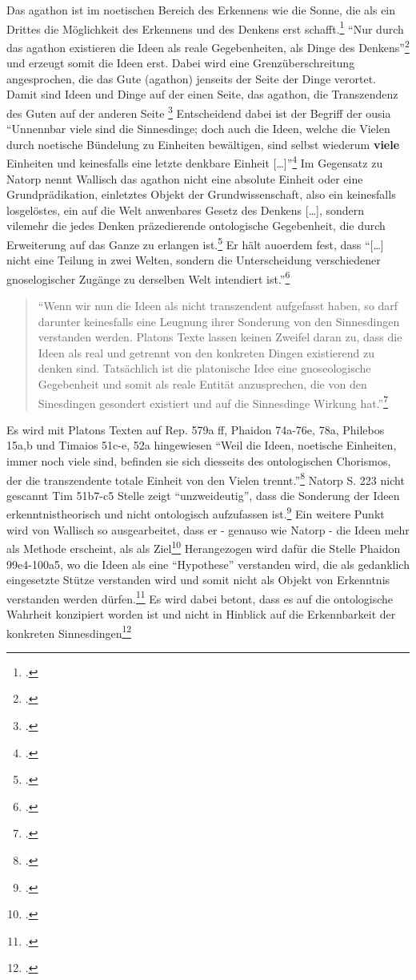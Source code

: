 \documentclass[12pt]{article}
\newcommand*{\zitatblock}[1]{%
    \begin{quote}
    \fontsize{10}{12}\selectfont
    \setlength{\parskip}{1.0em}
    #1
    \end{quote}
}
\begin{document}
Das agathon ist im noetischen Bereich des Erkennens wie die Sonne, die als ein Drittes die Möglichkeit des Erkennens und des Denkens erst schafft.\footcite[vgl.][S. 10]{Wallisch} 
\enquote{Nur durch das agathon existieren die Ideen als reale Gegebenheiten, als Dinge des Denkens}\footcite[][S. 11]{Wallisch} und erzeugt somit die Ideen erst. Dabei wird eine Grenzüberschreitung angesprochen, die das Gute (agathon) jenseits der Seite der Dinge verortet. Damit sind Ideen und Dinge auf der einen Seite, das agathon, die Transzendenz des Guten auf der anderen Seite \footcite[vgl.][S. 11]{Wallisch}
Entscheidend dabei ist der Begriff der ousia
\enquote{Unnennbar viele sind die Sinnesdinge; doch auch die Ideen, welche die Vielen durch noetische Bündelung zu Einheiten bewältigen, sind selbst wiederum \textbf{viele} Einheiten und keinesfalls eine letzte denkbare Einheit [\dots]}\footcite[vgl.][S. 12]{Wallisch}
Im Gegensatz zu Natorp nennt Wallisch das agathon nicht eine absolute Einheit oder eine Grundprädikation, einletztes Objekt der Grundwissenschaft, also ein keinesfalls losgelöstes, ein auf die Welt anwenbares Gesetz des Denkens [\dots], sondern vilemehr die jedes Denken präzedierende ontologische Gegebenheit, die durch Erweiterung auf das Ganze zu erlangen ist.\footcite[vgl.][S. 14]{Wallisch}
Er hält auoerdem fest, dass \enquote{[\dots] nicht eine Teilung in zwei Welten, sondern die Unterscheidung verschiedener gnoselogischer Zugänge zu derselben Welt intendiert ist.}\footcite[vgl.][S. 15]{Wallisch}
\zitatblock{\enquote{Wenn wir nun die Ideen als nicht transzendent aufgefasst haben, so darf darunter keinesfalls eine Leugnung ihrer Sonderung von den Sinnesdingen verstanden werden. Platons Texte lassen keinen Zweifel daran zu, dass die Ideen als real und getrennt von den konkreten Dingen existierend zu denken sind. Tatsächlich ist die platonische Idee eine gnoseologische Gegebenheit und somit als reale Entität anzusprechen, die von den Sinesdingen gesondert existiert und auf die Sinnesdinge Wirkung hat.}\footcite[][S. 17]{Wallisch}}
Es wird mit Platons Texten auf Rep. 579a ff, Phaidon 74a-76e, 78a, Philebos 15a,b und Timaios 51c-e, 52a hingewiesen
\enquote{Weil die Ideen, noetische Einheiten, immer noch viele sind, befinden sie sich diesseits des ontologischen Chorismos, der die transzendente totale Einheit von den Vielen trennt.}\footcite[][S. 17]{Wallisch}
Natorp S. 223 nicht gescannt
Tim 51b7-c5 Stelle zeigt \enquote{unzweideutig}, dass die Sonderung der Ideen erkenntnistheorisch und nicht ontologisch aufzufassen ist.\footcite[vgl.][S. 19]{Wallisch}
Ein weitere Punkt wird von Wallisch so ausgearbeitet, dass er - genauso wie Natorp - die Ideen mehr als Methode erscheint, als als Ziel\footcite[vgl.][S. 26]{Wallisch} Herangezogen wird dafür die Stelle Phaidon 99e4-100a5, wo die Ideen als eine \enquote{Hypothese} verstanden wird, die als gedanklich eingesetzte Stütze verstanden wird und somit nicht als Objekt von Erkenntnis verstanden werden dürfen.\footcite[vgl.][S. 26]{Wallisch} Es wird dabei betont, dass es auf die ontologische Wahrheit konzipiert worden ist und nicht in Hinblick auf die Erkennbarkeit der konkreten Sinnesdingen\footcite[vgl.][S. 27]{Wallisch}
\end{document}
